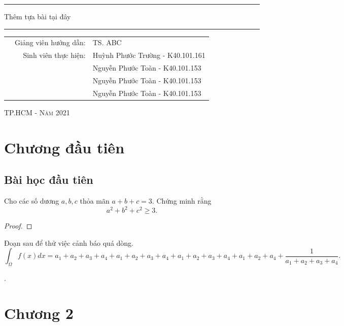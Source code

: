 \documentclass[a4paper,12pt,twosided]{report}
\begin{document}
\begin{titlepage}
\begin{center}
\begin{minipage}{\textwidth}
\rule{\textwidth}{0.8pt}
\begin{center}
{\large Thêm tựa bài tại đây}
\end{center}
\rule{\textwidth}{0.8pt}
\end{minipage}
\end{center}

\vspace{1cm}

\begin{table}[h]
\begin{tabular}{rrl}
\hspace{3 cm} & Giảng viên hướng dẫn: &TS. ABC\\
& Sinh viên thực hiện: & Huỳnh Phước Trường - K40.101.161\\
& & Nguyễn Phước Toàn - K40.101.153  \\
& & Nguyễn Phước Toàn - K40.101.153  \\
& & Nguyễn Phước Toàn - K40.101.153  \\
\end{tabular}
\end{table}

\vspace{2cm} %

\begin{center}
{\large \scshape TP.HCM - Năm 2021}
\end{center}
\end{titlepage}

\tableofcontents
\newpage


\chapter{Chương đầu tiên}

\section{Bài học đầu tiên}

\begin{theorem}Cho các số dương $a,b,c$ thỏa mãn $a+b+c = 3$. Chứng minh rằng
$$a^2+b^2+c^2 \ge 3.$$
\end{theorem}

\begin{proof} 
\end{proof}

Đoạn sau để thử việc cảnh báo quá dòng.
$$ \int_{\Omega} f(x) dx = a_1+a_2+a_3+a_4+ a_1+a_2+a_3+a_4+ a_1+a_2+a_3+a_4+ a_1+a_2+a_4+ 
\dfrac{1}{a_1+a_2+a_3+a_4}.$$

\cite{Reference1}.


\chapter{Chương 2}





\end{document}
